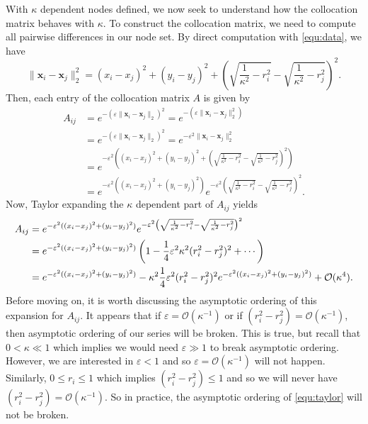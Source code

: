 \documentclass[a4paper,11pt]{article}
\newcommand{\eps}{\varepsilon}
\newcommand{\norm}[1]{\lVert #1 \rVert}
\newcommand{\bigO}{\mathcal{O}}
\newcommand{\bx}{\mathbf{x}}
\begin{document}
With $ \kappa $ dependent nodes defined, we now seek to understand how the collocation matrix behaves with $ \kappa $. To construct the collocation matrix, we need to compute all pairwise differences in our node set. By direct computation with \eqref{equ:data}, we have
\begin{equation}
	\norm{\bx_i - \bx_j}_2^2 = (x_i - x_j)^2 + (y_i - y_j)^2 + \left(\sqrt{\frac{1}{\kappa^2} - r_i^2} - \sqrt{\frac{1}{\kappa^2} - r_j^2}\right)^2. \label{equ:diff}
\end{equation}
Then, each entry of the collocation matrix $ A $ is given by
\begin{align*}
	A_{ij} &= e^{-(\eps \norm{\bx_i - \bx_j}_2)^2} = e^{-(\eps \norm{\bx_i - \bx_j}_2^2)} \\
	&= e^{-(\eps \norm{\mathbf{x}_i - \mathbf{x}_j}_2)^2} = e^{-\eps^2 \norm{\mathbf{x}_i - \mathbf{x}_j}_2^2} \\
	&= e^{-\eps^2 \left((x_i - x_j)^2 + (y_i - y_j)^2 + \left(\sqrt{\frac{1}{\kappa^2} - r_i^2} - \sqrt{\frac{1}{\kappa^2} - r_j^2}\right)^2\right)} \\
	&= e^{-\eps^2((x_i - x_j)^2 + (y_i - y_j)^2)} e^{-\eps^2 \left(\sqrt{\frac{1}{\kappa^2} - r_i^2} - \sqrt{\frac{1}{\kappa^2} - r_j^2}\right)^2}.
\end{align*}
Now, Taylor expanding the $ \kappa $ dependent part of $ A_{ij} $ yields
\begin{align}
	A_{ij} &= e^{-\eps^2((x_i - x_j)^2 + (y_i - y_j)^2)} e^{-\eps^2 \left(\sqrt{\frac{1}{\kappa^2} - r_i^2} - \sqrt{\frac{1}{\kappa^2} - r_j^2}\right)^2} \notag \\
	&= e^{-\eps^2((x_i - x_j)^2 + (y_i - y_j)^2)} \left(1 - \frac{1}{4} \eps^2 \kappa^2 (r_i^2 - r_j^2)^2 + \cdots\right) \notag \\
	&= e^{-\eps^2((x_i - x_j)^2 + (y_i - y_j)^2)} - \kappa^2 \frac{1}{4} \eps^2 (r_i^2 - r_j^2)^2 e^{-\eps^2((x_i - x_j)^2 + (y_i - y_j)^2)} + \bigO(\kappa^4). \label{equ:taylor}
\end{align}
Before moving on, it is worth discussing the asymptotic ordering of this expansion for $ A_{ij} $. It appears that if $ \eps = \bigO(\kappa^{-1}) $ or if $ (r_i^2 - r_j^2) = \bigO(\kappa^{-1}) $, then asymptotic ordering of our series will be broken. This is true, but recall that $ 0 < \kappa \ll 1 $ which implies we would need $ \eps \gg 1 $ to break asymptotic ordering. However, we are interested in $ \eps < 1 $ and so $ \eps = \bigO(\kappa^{-1}) $ will not happen. Similarly, $ 0 \leq r_i \leq 1 $ which implies $ (r_i^2 - r_j^2) \leq 1 $ and so we will never have $ (r_i^2 - r_j^2) = \bigO(\kappa^{-1}) $. So in practice, the asymptotic ordering of \eqref{equ:taylor} will not be broken.
\end{document}
